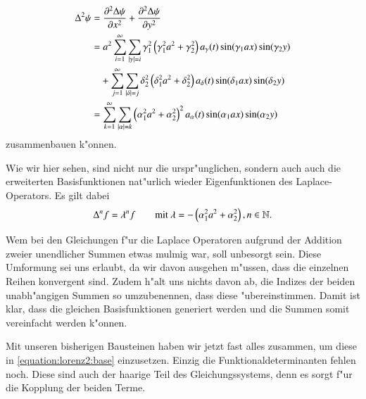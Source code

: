 \begin{align*}
\laplace^2\psi
&= 
\frac{\partial^2\laplace\psi}{\partial x^2} + 
\frac{\partial^2\laplace\psi}{\partial y^2}
\\
&=
a^2
\sum_{i = 1}^{\infty}
\sum_{|\gamma| = i}
\gamma_1^2
\left(\gamma_1^2 a^2+\gamma_2^2\right)
a_{\gamma}(t)
\sin(\gamma_1 ax) \sin(\gamma_2 y)
\\
&\phantom{={}}
+
\sum_{j = 1}^{\infty}
\sum_{|\delta| = j}
\delta_2^2
\left(\delta_1^2 a^2+\delta_2^2\right)
a_{\delta}(t)
\sin(\delta_1 ax) \sin(\delta_2 y)
\\
&=
\sum_{k = 1}^{\infty}
\sum_{|\alpha| = k}
\left(\alpha_1^2 a^2+\alpha_2^2\right)^2
a_{\alpha}(t)
\sin(\alpha_1 ax) \sin(\alpha_2 y)
\end{align*}
zusammenbauen k"onnen.

Wie wir hier sehen, sind nicht nur die urspr"unglichen, sondern auch auch die 
erweiterten Basisfunktionen nat"urlich wieder Eigenfunktionen des 
%
%
Laplace-Operators. Es gilt dabei
\begin{equation*}
	\laplace^n f = \lambda^n f
	\qquad
	\text{mit }
	\lambda = -\left(\alpha_1^2 a^2+\alpha_2^2\right),
	n \in \mathbb{N}.
\end{equation*}

Wem bei den Gleichungen f"ur die Laplace Operatoren aufgrund der Addition 
zweier unendlicher Summen etwas mulmig war, soll unbesorgt sein. Diese 
Umformung sei uns erlaubt, da wir davon ausgehen m"ussen, dass die einzelnen 
Reihen konvergent sind. Zudem h"alt uns nichts davon ab, die 
Indizes der beiden unabh"angigen Summen so umzubenennen, dass diese 
"ubereinstimmen. Damit ist klar, dass die gleichen Basisfunktionen generiert 
werden und die Summen somit vereinfacht werden k"onnen.

Mit unseren bisherigen Bausteinen haben wir jetzt fast alles zusammen, um diese 
in \cref{equation:lorenz2:base} einzusetzen. Einzig die Funktionaldeterminanten 
fehlen noch. Diese sind auch der haarige Teil des Gleichungssystems, denn es 
sorgt f"ur die Kopplung der beiden Terme.

